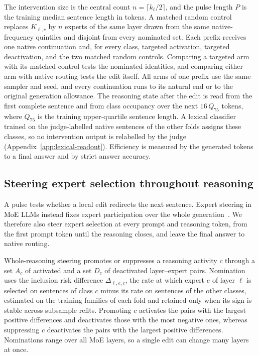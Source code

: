The intervention size is the central count $n=\lceil k_\ell/2\rceil$, and the pulse length $P$ is the training median sentence length in tokens.
%
A matched random control replaces $K_{\ell,c}$ by $n$ experts of the same layer drawn from the same native-frequency quintiles and disjoint from every nominated set.
%
Each prefix receives one native continuation and, for every class, targeted activation, targeted deactivation, and the two matched random controls.
%
Comparing a targeted arm with its matched control tests the nominated identities, and comparing either arm with native routing tests the edit itself.
%
All arms of one prefix use the same sampler and seed, and every continuation runs to its natural end or to the original generation allowance.
%
The reasoning state after the edit is read from the first complete sentence and from class occupancy over the next $16\,Q_{75}$ tokens, where $Q_{75}$ is the training upper-quartile sentence length.
%
A lexical classifier trained on the judge-labelled native sentences of the other folds assigns these classes, so no intervention output is relabelled by the judge (Appendix~\ref{app:lexical-readout}).
%
Efficiency is measured by the generated tokens to a final answer and by strict answer accuracy.
%

\subsection{Steering expert selection throughout reasoning}
\label{sec:whole-steering}

A pulse tests whether a local edit redirects the next sentence.
%
Expert steering in MoE LLMs instead fixes expert participation over the whole generation~\citep{fayyaz2025steermoe}.
%
We therefore also steer expert selection at every prompt and reasoning token, from the first prompt token until the reasoning closes, and leave the final answer to native routing.
%

Whole-reasoning steering promotes or suppresses a reasoning activity $c$ through a set $A_c$ of activated and a set $D_c$ of deactivated layer--expert pairs.
%
Nomination uses the inclusion risk difference $\Delta_{\ell,e,c}$, the rate at which expert $e$ of layer $\ell$ is selected on sentences of class $c$ minus its rate on sentences of the other classes, estimated on the training families of each fold and retained only when its sign is stable across subsample refits.
%
Promoting $c$ activates the pairs with the largest positive differences and deactivates those with the most negative ones, whereas suppressing $c$ deactivates the pairs with the largest positive differences.
%
Nominations range over all MoE layers, so a single edit can change many layers at once.
%

